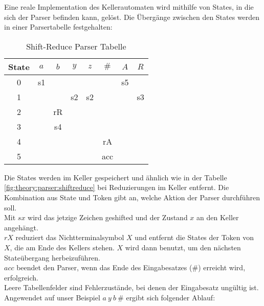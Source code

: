 Eine reale Implementation des Kellerautomaten wird mithilfe von States, in die sich der Parser befinden kann, gelöst.
Die Übergänge zwischen den States werden in einer Parsertabelle festgehalten:

\begin{table}[h]
\centering
\begin{tabular}{|c|c|c|c|c|c|c|c|}
State & $a$ & $b$ & $y$ & $z$ & $\#$ & $A$ & $R$ \\\hline
0     & s1        &           &           &          &          & s5 &   \\
1     &           &           & s2        & s2       &          &   & s3 \\
2     &           & rR        &           &          &          &   &   \\
3     &           & s4        &           &          &          &   &   \\
4     &           &           &           &          & rA       &   &   \\
5     &           &           &           &          & acc      &   &   \\
\end{tabular}
\caption{Shift-Reduce Parser Tabelle}
\end{table}

Die States werden im Keller gespeichert und ähnlich wie in der Tabelle \ref{fig:theory:parser:shiftreduce} bei Reduzierungen
im Keller entfernt.
Die Kombination aus State und Token gibt an, welche Aktion der Parser durchführen soll.\\
Mit $sx$ wird das jetzige Zeichen geshifted und der Zustand $x$ an den Keller angehängt.\\
$rX$ reduziert das Nichtterminalsymbol $X$ und entfernt die States der Token von $X$, die am Ende des Kellers stehen.
$X$ wird dann benutzt, um den nächsten Stateübergang herbeizuführen.\\
$acc$ beendet den Parser, wenn das Ende des Eingabesatzes ($\#$) erreicht wird, erfolgreich.\\
Leere Tabellenfelder sind Fehlerzustände, bei denen der Eingabesatz ungültig ist.\\

Angewendet auf unser Beispiel $a\ y\ b\ \#$ ergibt sich folgender Ablauf:

